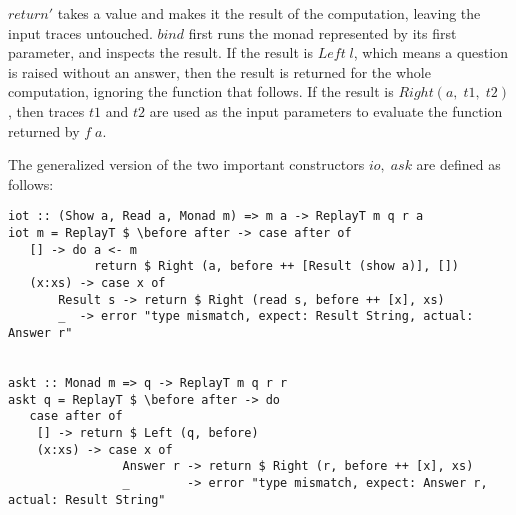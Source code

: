 \documentclass[10pt]{article}
\begin{document}
$return'$ takes a value and makes it the result of the computation, leaving the input traces untouched. $bind$ first runs the monad represented by its first parameter, and inspects the result. If the result is $Left\; l$, which means a question is raised without an answer, then the result is returned for the whole computation, ignoring the function that follows. If the result is $Right(a,\; t1,\; t2)$, then traces $t1$ and $t2$ are used as the input parameters to evaluate the function returned by $f\; a$.

The generalized version of the two important constructors $io,\; ask$ are defined as follows:
 \begin{lstlisting}
iot :: (Show a, Read a, Monad m) => m a -> ReplayT m q r a                                                                                                                                    
iot m = ReplayT $ \before after -> case after of                                                                                                                                              
   [] -> do a <- m                                                                                                                                          
            return $ Right (a, before ++ [Result (show a)], [])                                                                                             
   (x:xs) -> case x of                                                                                                                                      
       Result s -> return $ Right (read s, before ++ [x], xs)                                                                                       
       _  -> error "type mismatch, expect: Result String, actual: Answer r"
                                                 
                                                 
askt :: Monad m => q -> ReplayT m q r r                                                                                                                                                       
askt q = ReplayT $ \before after -> do                                                                                                                                                        
   case after of                                                                                                                                                                              
    [] -> return $ Left (q, before)                                                                                                                                                           
    (x:xs) -> case x of                                                                                                                                                                       
                Answer r -> return $ Right (r, before ++ [x], xs)                                                                                                                             
                _        -> error "type mismatch, expect: Answer r, actual: Result String"
\end{lstlisting}
\end{document}
